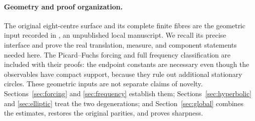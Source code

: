 \paragraph{Geometry and proof organization.}
The original eight-centre surface and its complete finite fibres are
the geometric input recorded in \cite{QPI30Local2026}, an unpublished
local manuscript. We recall its precise interface and prove the real
translation, measure, and component statements needed here.
The Picard--Fuchs forcing and full frequency classification are
included with their proofs: the endpoint constants are necessary
even though the observables have compact support, because they rule
out additional stationary circles. These geometric inputs are not
separate claims of novelty. Sections~\ref{sec:forcing} and
\ref{sec:frequency} establish them; Sections~\ref{sec:hyperbolic}
and \ref{sec:elliptic} treat the two degenerations; and
Section~\ref{sec:global} combines the estimates, restores the original
parities, and proves sharpness.
